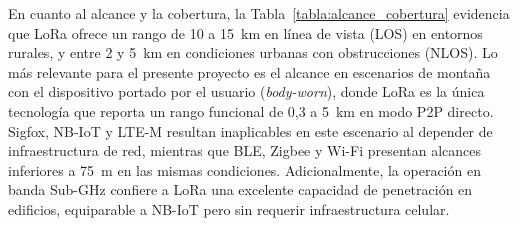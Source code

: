 En cuanto al alcance y la cobertura, la Tabla~\ref{tabla:alcance_cobertura} evidencia que LoRa ofrece un rango de 10 a 15~km en línea de vista (LOS) en entornos rurales, y entre 2 y 5~km en condiciones urbanas con obstrucciones (NLOS). Lo más relevante para el presente proyecto es el alcance en escenarios de montaña con el dispositivo portado por el usuario (\textit{body-worn}), donde LoRa es la única tecnología que reporta un rango funcional de 0,3 a 5~km en modo P2P directo. Sigfox, NB-IoT y LTE-M resultan inaplicables en este escenario al depender de infraestructura de red, mientras que BLE, Zigbee y Wi-Fi presentan alcances inferiores a 75~m en las mismas condiciones. Adicionalmente, la operación en banda Sub-GHz confiere a LoRa una excelente capacidad de penetración en edificios, equiparable a NB-IoT pero sin requerir infraestructura celular.

\begin{table}[H]
\begin{center}
\caption{Comparación de alcance y cobertura en distintos entornos para tecnologías candidatas en SAR.}
\label{tabla:alcance_cobertura}
\end{center}
\end{table}


